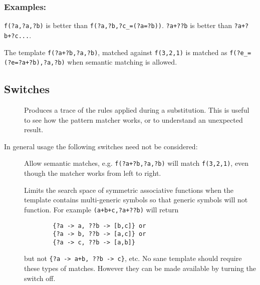 \subsubsection*{Examples:}

\texttt{f(?a,?a,?b)} is better than \texttt{f(?a,?b,?c\_=(?a=?b))}.
\texttt{?a+??b} is better than \texttt{?a+?b+?c...}.

The template \texttt{f(?a+?b,?a,?b)}, matched against \texttt{f(3,2,1)} is
matched as \texttt{f(?e\_=(?e=?a+?b),?a,?b)} when semantic matching is allowed.


\subsection{Switches}

\begin{description}
\item[]
  \hypertarget{switch:TRPM}{}%
  Produces a trace of the rules applied during a
    substitution.  This is useful to see how the pattern matcher works, or to
    understand an unexpected result.
\end{description}
In general usage the following switches need not be considered:
\begin{description}
\item[]
  \hypertarget{switch:SEMANTIC}{}%
  Allow semantic matches, e.g. \texttt{f(?a+?b,?a,?b)}
    will match \texttt{f(3,2,1)}, even though the matcher works from left to
    right.
  \item[]
  \hypertarget{switch:SYM!-ASSOC}{}%
    Limits the search space of symmetric associative
    functions when the template contains multi-generic symbols so that generic
    symbols will not function. For example \texttt{(a+b+c,?a+??b)} will return
      \begin{verbatim}
        {?a -> a, ??b -> [b,c]} or
        {?a -> b, ??b -> [a,c]} or
        {?a -> c, ??b -> [a,b]}
      \end{verbatim}
    but not \texttt{\{?a -> a+b, ??b -> c\}}, etc.  No sane template should
    require these types of matches.  However they can be made available by
    turning the switch off.
\end{description}
